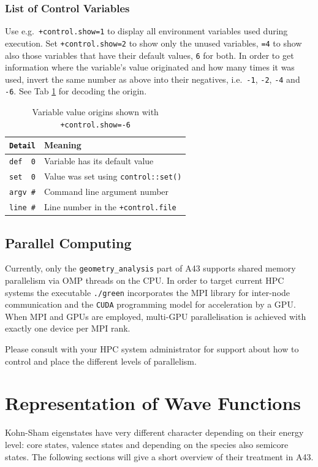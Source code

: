 \documentclass[oribibl]{llncs}
\newcommand{\ttt}[1]{\texttt{#1}}
\newcommand{\codename}{A43}
\begin{document}
\subsubsection{List of Control Variables} \label{sec:list-of-control-variables}
%
Use e.g.~\ttt{+control.show=1} to display all environment variables used during execution.
Set \ttt{+control.show=2} to show only the unused variables, \ttt{=4} to show also those variables that have their default values, \ttt{6} for both.
In order to get information where the variable's value originated and how many times it was used, invert the same number as above into their negatives, i.e.~\ttt{-1}, \ttt{-2}, \ttt{-4} and \ttt{-6}.
See Tab \ref{tab:control-show-details} for decoding the origin. 
%
%
\begin{table}[ht!]
\caption[Variable value origins]{
Variable value origins shown with \ttt{+control.show=-6}
} \label{tab:control-show-details}
\centering
\begin{tabular}{|l|l|}
\hline
  	 \ttt{Detail}    & Meaning   \\
\hline
     \verb+def  0+   & Variable has its default value      \\
     \verb+set  0+   & Value was set using \ttt{control::set()} \\
     \ttt{argv \#}   & Command line argument number \\
     \ttt{line \#}   & Line number in the \ttt{+control.file} \\
\hline
\end{tabular}
\end{table}


\subsection{Parallel Computing} \label{sec:parallelization}
%
Currently, only the \ttt{geometry\_analysis} part of \codename{} supports shared memory parallelism 
via \ac{OMP} threads on the \ac{CPU}.
In order to target current \ac{HPC} systems 
the executable \ttt{./green} incorporates the \ac{MPI} library
for inter-node communication
and the \ttt{CUDA} programming model for acceleration by a \ac{GPU}.
When \ac{MPI} and \ac{GPU}s are employed, multi-\ac{GPU} parallelisation is achieved
with exactly one device per \ac{MPI} rank.

\noindent
Please consult with your \ac{HPC} system administrator for support
about how to control and place the different levels of parallelism.

\section{Representation of Wave Functions} \label{sec:representation}
%
Kohn-Sham eigenstates have very different character depending on their energy level: core states, valence states and depending on the species also semicore states. The following sections will give a short overview of their treatment in \codename{}.
%
%
\end{document}

